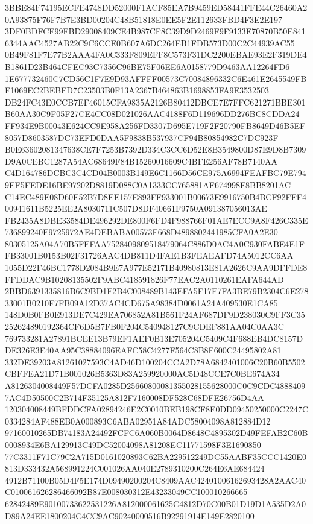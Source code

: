 \documentclass[UTF8,fontset=fandol,zihao=-4,a4paper]{ctexart}
\begin{document}
{{3BBE84F74195ECFE4748DD52000F1ACF85EA7B9459ED58441FFE44C26460A20A93875F76F7B7E3BD00204C48B51818E0EE5F2E112633FBD4F3E2E197
3DF0BDFCF99FBD29008409CE4B987CF8C39D9D2469F9F9133E70870B50E8416344AAC4527AB22C9C6CCE0B607A6DC264EB1FDB573D00C2C44939AC55
0B49F81F7E77B2AAA4FA0C333F809EFF8C573F31DC2200EBAE93E2F319DE4B1861D23B464CFEC93C7356C96BE75F06EE6A0158779D9463AA12264FD6
1E677732460C7CD56C1F7E9D93AFFFF00573C70084896332C6E461E2645549FBF1069EC2BEBFD7C23503B0F13A2367B464863B1698853FA9E3532503
DB24FC43E0CCB7EF46015CFA9835A2126B80412DBCE7E7FFC621271BBE301B60AA30C9F05F27CE4CC08D021026AAC4188F6D119696DD276BC8CDDA24
FF934E9B00043E624CC9E958A256FD3307D695E719F2F20790FB8649D46B5EF8057D8603587DC73EFD0DAA5F9838B537937CF94B80854982C7DC923F
B0E63602081347638CE7F7253B7392D334C3CC6D52E8B3549800D87E9D8B7309D9A0CEBC1287A54AC68649F84B15260016609C4BFE256AF78B7140AA
C4D164786DCBC3C4CD04B0003B149E6C1166D56CE975A6994FEAFBC79E7949EF5FEDE16BE97202D8819D088C0A1333CC765881AF674998F8BB8201AC
C14EC489E08D60E52B7D8EE157E893FF933001B00673E9916750B4BCF92FFF400941611B5225EE2A8030711C507D8DF40661F9750A091387056013AE
FB2435A8DBE33584DE496292DE800F6FD4F988766F01AE7ECC9A8F426C335E736899240E9725972AE4DEBABA00573F668D4898802441985CFA0A2E30
80305125A04A70B5FEFAA7528409809518479064C886D0AC4A0C930FABE4E1FFB33001B0153B02F31726AAC4DB811D4FAE1B3FEAEAFD74A5012CC6AA
1055D22F46BC1778D2084B9E7A977E52171B40980813E81A2626C9AA9DFFDE8FFDDAC9B10208135502F9ABC418591826F77EAC2A0110261EAFA644AD
2BBD6391335816B6C9BD1F2B4C008489B143EFA5F17F7FA3BE79B2304C6E27833001B0210F7FB09A12D37AC4CD675A98384D0061A24A409530E1CA85
148D0B0FB0E913DE7C429EA706852A81B561F24AF687DF9D238030C9FF3C35252624890192364CF6D5B7FB0F204C540948127C9CDEF881AA04C0AA3C
769733281A27891BCEE13B79EF1AEF0B13E705204C5409C4F688EB4DC8157DDE326E3E40AA95C38884096EAFC58C4277F564C8B8F600C24495802A81
332DE39203A81261027593C4AD46D100204CCA2D78A6842401006C20B60B5502CBFFEA21D71B001026B5363D83A259920000AC5D48CCE7C0BE674A34
A8126304008449F57DCFA0285D25660800081355028155628000C0C9CDC48884097AC4D50500C2B714F35125A812F7160008DF528C68DFE26756D4AA
120304008449BFDDCFA02894246E2C0010BEB198CF8E0DD09450250000C2247C0334284AF488EB0A000893C6ABA02951A84ADC58004098A812884D12
97160010265DB74183A24492FCFC6A060B0064D8648C4895302D49FEFAB2C60B0008934E6BA129913C49DC52004098A81208EC11771598F3E1690850
77C3311F71C79C2A715D0161020893C62BA229512249DC55AABF35CCC1420E0813D333432A568991224C001026AA040E2789310200C264E6AE684424
4912B71100B05D4F5E174D09490200204C8409AAC42401006162693428A2AAC40C010061626286466092B87E008030312E43233049CC100010266665
62842489E90100733622531226A812000061625C4812D70C00B01D19D1A535D2A0D89A24EE1800204C4CC9AC90240000516B92291914E149E2820100
}}
\end{document}
